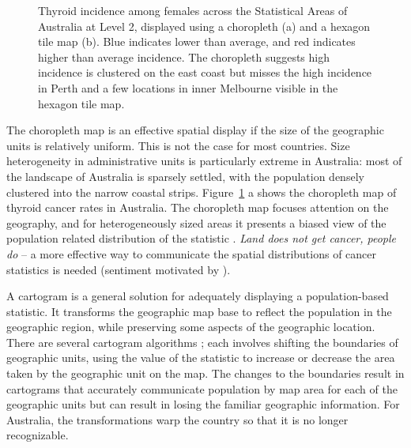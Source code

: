 \documentclass[
doublespace,
  times]{anzsauth}
\begin{document}
\begin{figure}


\caption{\label{fig-thyroid}Thyroid incidence among females across the
Statistical Areas of Australia at Level 2, displayed using a choropleth
(a) and a hexagon tile map (b). Blue indicates lower than average, and
red indicates higher than average incidence. The choropleth suggests
high incidence is clustered on the east coast but misses the high
incidence in Perth and a few locations in inner Melbourne visible in the
hexagon tile map.}

\end{figure}%

The choropleth map is an effective spatial display if the size of the
geographic units is relatively uniform. This is not the case for most
countries. Size heterogeneity in administrative units is particularly
extreme in Australia: most of the landscape of Australia is sparsely
settled, with the population densely clustered into the narrow coastal
strips. Figure~\ref{fig-thyroid} a shows the choropleth map of thyroid
cancer rates in Australia. The choropleth map focuses attention on the
geography, and for heterogeneously sized areas it presents a biased view
of the population related distribution of the statistic \citep{CBATCC}.
\emph{Land does not get cancer, people do} -- a more effective way to
communicate the spatial distributions of cancer statistics is needed
(sentiment motivated by \citet{monmonier2018how}).

A cartogram is a general solution for adequately displaying a
population-based statistic. It transforms the geographic map base to
reflect the population in the geographic region, while preserving some
aspects of the geographic location. There are several cartogram
algorithms \citep[\citet{CBATCC}]{ACTUC}; each involves shifting the
boundaries of geographic units, using the value of the statistic to
increase or decrease the area taken by the geographic unit on the map.
The changes to the boundaries result in cartograms that accurately
communicate population by map area for each of the geographic units but
can result in losing the familiar geographic information. For Australia,
the transformations warp the country so that it is no longer
recognizable.
\end{document}
